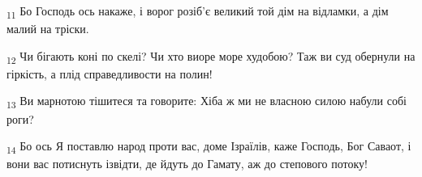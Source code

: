 \begin{tcolorbox}
\textsubscript{11} Бо Господь ось накаже, і ворог розіб'є великий той дім на відламки, а дім малий на тріски.
\end{tcolorbox}
\begin{tcolorbox}
\textsubscript{12} Чи бігають коні по скелі? Чи хто виоре море худобою? Таж ви суд обернули на гіркість, а плід справедливости на полин!
\end{tcolorbox}
\begin{tcolorbox}
\textsubscript{13} Ви марнотою тішитеся та говорите: Хіба ж ми не власною силою набули собі роги?
\end{tcolorbox}
\begin{tcolorbox}
\textsubscript{14} Бо ось Я поставлю народ проти вас, доме Ізраїлів, каже Господь, Бог Саваот, і вони вас потиснуть ізвідти, де йдуть до Гамату, аж до степового потоку!
\end{tcolorbox}
